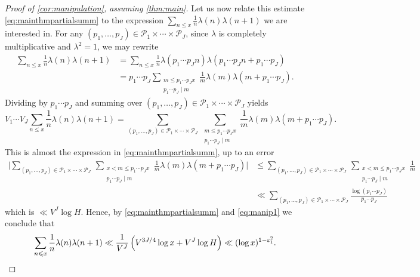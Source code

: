 \documentclass[11pt]{amsart}
\theoremstyle{definition}
\renewcommand{\leq}{\leqslant}
\newcommand{\eps}{\varepsilon}
\newcommand{\primes}{\mathcal{P}}
\newcommand{\cstH}{\eps_1}
\newcommand{\curlyL}{V}
\newcommand{\curlyLpower}{V^{\repR}}
\newcommand{\curlyLexp}[1]{V^{#1}}
\newcommand{\repR}{J}
\begin{document}
\begin{proof}[Proof of \cref{cor:manipulation}, assuming \cref{thm:main}]
Let us now relate this estimate \cref{eq:mainthmpartialsumm} to the expression $\sum_{n\leq x} \frac 1n \lambda(n) \lambda(n+1)$ we are interested in. For any $(p_1, \ldots, p_{\repR})\in \primes_1\times \cdots \times \primes_{\repR}$, since $\lambda$ is completely multiplicative and $\lambda^2=1$, we may rewrite
\begin{align*}
\sum_{n\leq x} \frac 1n \lambda(n) \lambda(n+1) &=  \sum_{n\leq x} \frac 1n \lambda(p_1\cdots p_{\repR}n) \lambda(p_1\cdots p_{\repR}n+p_1\cdots p_{\repR})\\ &= p_1\cdots p_{\repR} \sum_{\substack{m\leq p_1\cdots p_{\repR}x\\ p_1\cdots p_{\repR}\mid m}} \frac 1m \lambda(m) \lambda(m+p_1\cdots p_{\repR}).
\end{align*}
Dividing by $p_1\cdots p_{\repR}$ and summing over $(p_1, \ldots, p_{\repR})\in \primes_1\times \cdots \times \primes_{\repR}$ yields
\begin{equation}
\label{eq:manip1}
\curlyL_1\cdots \curlyL_{\repR} \sum_{n\leq x} \frac 1n \lambda(n) \lambda(n+1) = \sum_{(p_1, \ldots, p_{\repR})\in \primes_1\times \cdots \times \primes_{\repR}}\, \sum_{\substack{m\leq p_1\cdots p_{\repR}x\\ p_1\cdots p_{\repR}\mid m}} \frac 1m \lambda(m) \lambda(m+p_1\cdots p_{\repR}). 
\end{equation}
This is almost the expression in \cref{eq:mainthmpartialsumm}, up to an error
\begin{align*}
\Bigg|\sum_{(p_1, \ldots, p_{\repR})\in \primes_1\times \cdots \times \primes_{\repR}}\, \sum_{\substack{x<m\leq p_1\cdots p_{\repR}x\\ p_1\cdots p_{\repR}\mid m}} \frac 1m \lambda(m) \lambda(m+p_1\cdots p_{\repR})\Bigg| &\leq \sum_{(p_1, \ldots, p_{\repR})\in \primes_1\times \cdots \times \primes_{\repR}}\, \sum_{\substack{x<m\leq p_1\cdots p_{\repR}x\\ p_1\cdots p_{\repR}\mid m}} \frac 1m\\ 
 &\ll \sum_{(p_1, \ldots, p_{\repR})\in \primes_1\times \cdots \times \primes_{\repR}} \frac{\log(p_1\cdots p_{\repR})}{p_1\cdots p_{\repR}}
\end{align*}
which is $\ll \curlyLpower \log H$. Hence, by \cref{eq:mainthmpartialsumm} and \cref{eq:manip1} we conclude that
\begin{equation*}
\sum_{n\leq x} \frac 1n \lambda(n) \lambda(n+1) \ll \frac{1}{\curlyLpower} \left({\curlyLexp{3\repR/4} \log x} +\curlyLpower \log H \right) \ll (\log x)^{1-\cstH^2}. \qedhere
\end{equation*}
\end{proof}
\end{document}
